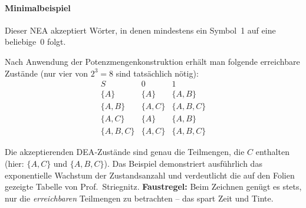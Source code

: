 \paragraph{Minimalbeispiel}\leavevmode
\begin{center}
\end{center}
Dieser NEA akzeptiert Wörter, in denen mindestens ein Symbol~1 auf eine beliebige~0 folgt.

\medskip
\noindent
Nach Anwendung der Potenzmengenkonstruktion erhält man folgende erreichbare Zustände (nur vier von $2^{3}=8$ sind tatsächlich nötig):
\[
\begin{array}{c|c|c}
S & 0 & 1\\\hline
\{A\} & \{A\} & \{A,B\} \\
\{A,B\} & \{A,C\} & \{A,B,C\} \\
\{A,C\} & \{A\} & \{A,B\} \\
\{A,B,C\} & \{A,C\} & \{A,B,C\}
\end{array}
\]
\begin{center}
\end{center}
Die akzeptierenden DEA‑Zustände sind genau die Teilmengen, die $C$ enthalten (hier: $\{A,C\}$ und $\{A,B,C\}$).  
Das Beispiel demonstriert ausführlich das exponentielle Wachstum der Zustandsanzahl und verdeutlicht die auf den Folien gezeigte Tabelle von Prof.~Striegnitz.  
\medskip
\textbf{Faustregel:} Beim Zeichnen genügt es stets, nur die \emph{erreichbaren} Teilmengen zu betrachten – das spart Zeit und Tinte.

